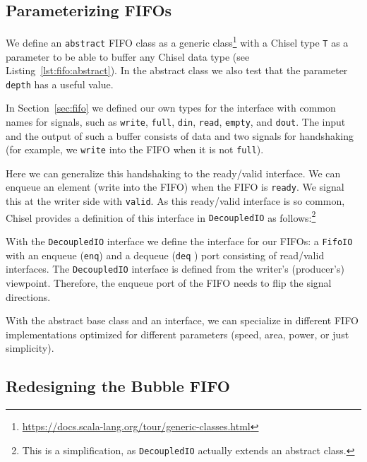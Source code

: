 \documentclass[%
    10pt,
    headinclude, footexclude,
    openright, %
    notitlepage,
    cleardoubleempty,
    headsepline,
    pointlessnumbers,
    bibtotoc, idxtotoc,
    ]{scrbook}
\newcommand{\code}[1]{{\lstinline[basicstyle=\small\ttfamily]{#1}}}
\newcommand{\codefoot}[1]{{\lstinline[basicstyle=\footnotesize\ttfamily]{#1}}}
\newcommand{\myref}[2]{\href{#1}{#2}}
\renewcommand{\myref}[2]{{#2}{\footnote{\url{#1}}}}
\begin{document}
\subsection{Parameterizing FIFOs}

We define an \code{abstract}
FIFO class as a \myref{https://docs.scala-lang.org/tour/generic-classes.html}{generic class}
with a Chisel type \code{T} as a parameter to be able to buffer
any Chisel data type (see Listing~\ref{lst:fifo:abstract}). In the abstract class we also test that the
parameter \code{depth} has a useful value.


In Section~\ref{sec:fifo} we defined our own types for the interface with common
names for signals, such as \code{write}, \code{full}, \code{din}, \code{read},
\code{empty}, and \code{dout}. The input and the output of such a buffer consists
of data and two signals for handshaking (for example, we \code{write} into the FIFO when
it is not \code{full}).

Here we can generalize this handshaking to the ready/valid interface.
We can enqueue an element (write into the FIFO) when the FIFO is \code{ready}.
We signal this at the writer side with \code{valid}.
As this ready/valid interface is so common, Chisel provides a definition
of this interface in \code{DecoupledIO} as follows:\footnote{This is a simplification,
as \codefoot{DecoupledIO} actually extends an abstract class.}


\noindent With the \code{DecoupledIO} interface we define the interface for our FIFOs:
a \code{FifoIO} with an enqueue (\code{enq}) and a dequeue (\code{deq} ) port consisting
of read/valid interfaces.
 The \code{DecoupledIO} interface is defined from the writer's (producer's) viewpoint.
Therefore, the enqueue port of the FIFO needs to flip the signal directions.



With the abstract base class and an interface, we can specialize in different
FIFO implementations optimized for different parameters (speed, area, power,
or just simplicity).

\subsection{Redesigning the Bubble FIFO}
\end{document}
